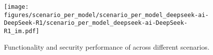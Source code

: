 
\begin{figure}[h]
    \centering
    \texttt{[image: figures/scenario\_per\_model/scenario\_per\_model\_deepseek-ai-DeepSeek-R1/scenario\_per\_model\_deepseek-ai-DeepSeek-R1\_im.pdf]}
    \caption{Functionality and security performance of \dsro{} across different scenarios.}
    \label{fig:scenario_per_model_deepseek-ai-DeepSeek-R1}
\end{figure}
